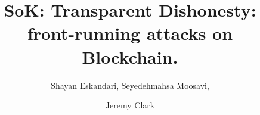 \documentclass[envcountsect]{llncs}
\begin{document}
\frontmatter
\mainmatter

\title{SoK: Transparent Dishonesty: front-running attacks on Blockchain.}
\author{}
\author{Shayan Eskandari, Seyedehmahsa Moosavi, \and Jeremy Clark}
\institute{}
\maketitle














\end{document}
